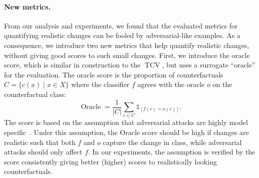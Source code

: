 \documentclass[11pt,a4paper,twoside,openright,final]{memoir}
\begin{document}
\paragraph{New metrics.}
From our analysis and experiments, we found that the evaluated metrics for quantifying realistic changes can be fooled by adversarial-like examples.
As a consequence, we introduce two new metrics that help quantify realistic changes, without giving good scores to such small changes.
First, we introduce the oracle score, which is similar in construction to the $\operatorname{TCV}$, but uses a surrogate ``oracle'' for the evaluation.
The oracle score is the proportion of counterfactuals $C = \{c(x)  \mid x \in X\}$ where the classifier $f$ agrees with the oracle $o$ on the counterfactual class: 
\begin{equation}\label{eq:oracle}
    \operatorname{Oracle} = \frac{1}{|C|}\sum_{c\in C} \mathbb{1}_{[ f(c) = o(c) ]}.
\end{equation}
The score is based on the assumption that adversarial attacks are highly model specific~\cite{Liu2017}.
Under this assumption, the Oracle score should be high if changes are realistic such that both $f$ and $o$ capture the change in class, while adversarial attacks should only affect $f$.
In our experiments, the assumption is verified by the score consistently giving better (higher) scores to realistically looking counterfactuals.
\end{document}
